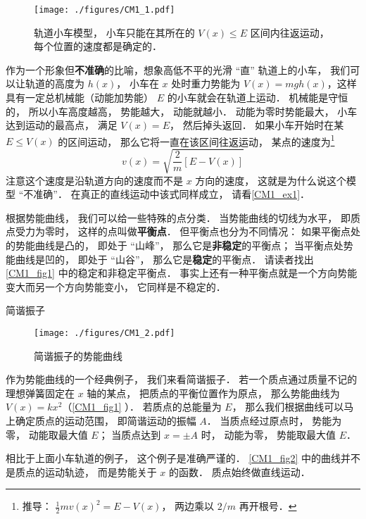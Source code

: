 \begin{figure}[ht]
\centering
\texttt{[image: ./figures/CM1\_1.pdf]}
\caption{轨道小车模型， 小车只能在其所在的 $V(x) \leqslant E$ 区间内往返运动， 每个位置的速度都是确定的．} \label{CM1_fig1}
\end{figure}

作为一个形象但\textbf{不准确}的比喻，想象高低不平的光滑 “直” 轨道上的小车， 我们可以让轨道的高度为 $h(x)$， 小车在 $x$ 处时重力势能为 $V(x) = mgh(x)$，这样具有一定总机械能（动能加势能） $E$ 的小车就会在轨道上运动． 机械能是守恒的， 所以小车高度越高， 势能越大， 动能就越小． 动能为零时势能最大， 小车达到运动的最高点， 满足 $V(x) = E$， 然后掉头返回． 如果小车开始时在某 $E \leq V(x)$ 的区间运动， 那么它将一直在该区间往返运动， 某点的速度为\footnote{推导： $\frac{1}{2}mv(x)^2 = E - V(x)$， 两边乘以 $2/m$ 再开根号．}
\begin{equation}\label{CM1_eq1}
v(x) = \sqrt{\frac{2}{m}[E - V(x)]}
\end{equation}
注意这个速度是沿轨道方向的速度而不是 $x$ 方向的速度， 这就是为什么说这个模型 “不准确”． 在真正的直线运动中该式同样成立， 请看\autoref{CM1_ex1}．

根据势能曲线， 我们可以给一些特殊的点分类． 当势能曲线的切线为水平， 即质点受力为零时， 这样的点叫做\textbf{平衡点}． 但平衡点也分为不同情况： 如果平衡点处的势能曲线是凸的， 即处于 “山峰”， 那么它是\textbf{非稳定}的平衡点； 当平衡点处势能曲线是凹的， 即处于 “山谷”， 那么它是\textbf{稳定}的平衡点． 请读者找出\autoref{CM1_fig1} 中的稳定和非稳定平衡点． 事实上还有一种平衡点就是一个方向势能变大而另一个方向势能变小， 它同样是不稳定的．


\begin{example}{简谐振子}\label{CM1_ex1}
\begin{figure}[ht]
\centering
\texttt{[image: ./figures/CM1\_2.pdf]}
\caption{简谐振子的势能曲线} \label{CM1_fig2}
\end{figure}

作为势能曲线的一个经典例子， 我们来看简谐振子． 若一个质点通过质量不记的理想弹簧固定在 $x$ 轴的某点， 把质点的平衡位置作为原点， 那么势能曲线为 $V(x) = kx^2$（\autoref{CM1_fig1} ）． 若质点的总能量为 $E$， 那么我们根据曲线可以马上确定质点的运动范围， 即简谐运动的振幅 $A$． 当质点经过原点时， 势能为零， 动能取最大值 $E$； 当质点达到 $x = \pm A$ 时， 动能为零， 势能取最大值 $E$．
\end{example}
相比于上面小车轨道的例子， 这个例子是准确严谨的． \autoref{CM1_fig2} 中的曲线并不是质点的运动轨迹， 而是势能关于 $x$ 的函数． 质点始终做直线运动．

